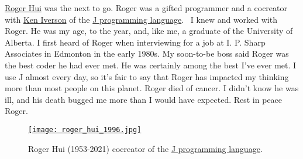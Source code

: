
\href{https://rogerhui.rip/}{Roger Hui} was the next to go. Roger was a
gifted programmer and a cocreator with
\href{https://en.wikipedia.org/wiki/Kenneth_E._Iverson}{Ken Iverson} of
the \href{https://www.jsoftware.com/\#/}{J programming language}.~ I
knew and worked with Roger. He was my age, to the year, and, like me, a
graduate of the University of Alberta. I first heard of Roger when
interviewing for a job at I. P. Sharp Associates in Edmonton in the
early 1980s. My soon-to-be boss said Roger was the best coder he had
ever met. He was certainly among the best I've ever met. I use J almost
every day, so it's fair to say that Roger has impacted my thinking more
than most people on this planet. Roger died of cancer. I didn't know he
was ill, and his death bugged me more than I would have expected. Rest
in peace Roger.


\begin{SCfigure}[2]
\centering
\href{https://bakerjd99.files.wordpress.com/2022/01/roger_hui_1996.jpg}{\texttt{[image: roger\_hui\_1996.jpg]}}
\caption{Roger Hui (1953-2021) cocreator of the \href{https://www.jsoftware.com}{J programming language}.}
\label{fig:7274x1}
\end{SCfigure}


